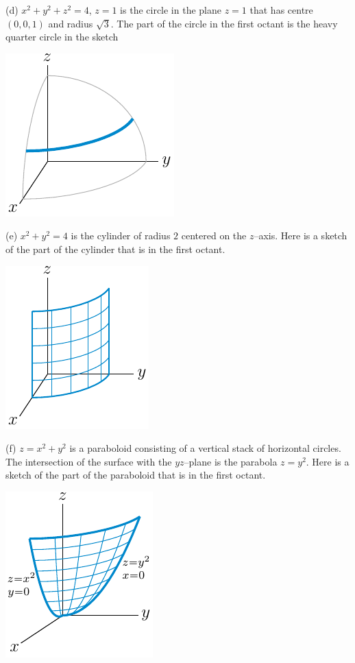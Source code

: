 \begin{answer}
(d)
$x^2+y^2+z^2=4$, $z=1$ is the circle in the plane $z=1$ 
that has centre $(0,0,1)$ and radius $\sqrt{3}$. The part of the circle
in the first octant is the heavy quarter circle in the sketch

\begin{center}
     \includegraphics{fig/quarterCircle.pdf}
\end{center}


(e)
$x^2+y^2=4$ is the cylinder of radius $2$ centered on the $z$--axis.
Here is a sketch of the part of the cylinder that is in the first octant.

\begin{center}
     \includegraphics{fig/quarterCylinder.pdf}
\end{center}


(f) $z=x^2+y^2$ is a paraboloid consisting of a vertical stack of 
horizontal circles. The intersection of the surface with the $yz$--plane 
is the parabola $z=y^2$.  Here is a sketch of the part of the paraboloid 
that is in the first octant.

\begin{center}
     \includegraphics{fig/quarterParaboloid.pdf}
\end{center}

\end{answer}


